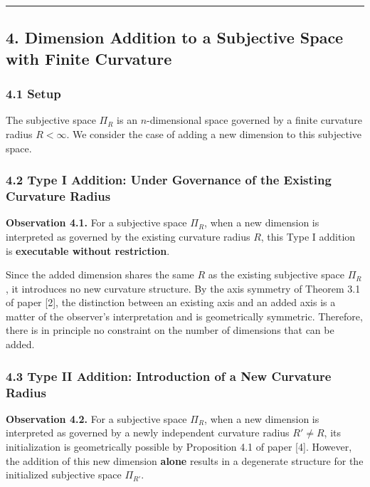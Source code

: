 \documentclass[a4paper,11pt]{article}
\theoremstyle{definition}
\begin{document}
\begin{center}\rule{0.5\linewidth}{0.5pt}\end{center}

\subsection{4. Dimension Addition to a Subjective Space with Finite Curvature}\label{dimension-addition-to-a-subjective-space-with-finite-curvature}

\subsubsection{4.1 Setup}\label{setup-1}

The subjective space \(\Pi_R\) is an \(n\)-dimensional space governed by a finite curvature radius \(R < \infty\). We consider the case of adding a new dimension to this subjective space.

\subsubsection{4.2 Type I Addition: Under Governance of the Existing Curvature Radius}\label{type-i-addition-under-governance-of-the-existing-curvature-radius}

\textbf{Observation 4.1.} For a subjective space \(\Pi_R\), when a new dimension is interpreted as governed by the existing curvature radius \(R\), this Type I addition is \textbf{executable without restriction}.

Since the added dimension shares the same \(R\) as the existing subjective space \(\Pi_R\), it introduces no new curvature structure. By the axis symmetry of Theorem 3.1 of paper {[}2{]}, the distinction between an existing axis and an added axis is a matter of the observer's interpretation and is geometrically symmetric. Therefore, there is in principle no constraint on the number of dimensions that can be added.

\subsubsection{4.3 Type II Addition: Introduction of a New Curvature Radius}\label{type-ii-addition-introduction-of-a-new-curvature-radius}

\textbf{Observation 4.2.} For a subjective space \(\Pi_R\), when a new dimension is interpreted as governed by a newly independent curvature radius \(R' \neq R\), its initialization is geometrically possible by Proposition 4.1 of paper {[}4{]}. However, the addition of this new dimension \textbf{alone} results in a degenerate structure for the initialized subjective space \(\Pi_{R'}\).
\end{document}
